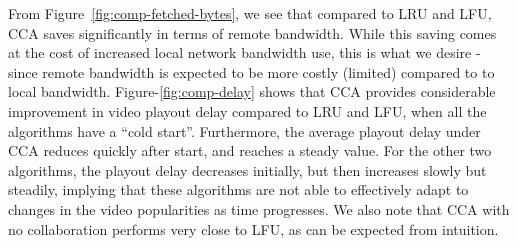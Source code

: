 \documentclass[conference]{IEEEtran}
\begin{document}

From Figure~\ref{fig:comp-fetched-bytes}, we see that compared to LRU and LFU, CCA saves significantly in terms of remote bandwidth. While this saving comes at the cost of increased local network bandwidth use, this is what we desire - since remote bandwidth is expected to be more costly (limited) compared to to local bandwidth. Figure-\ref{fig:comp-delay} shows that CCA provides considerable improvement in video playout delay compared to LRU and LFU, when all the algorithms have a ``cold start''. Furthermore, the average playout delay under CCA reduces quickly after start, and reaches a steady value. For the other two algorithms, the playout delay decreases initially, but then increases slowly but steadily, implying that these algorithms are not able to effectively adapt to changes in the video popularities as time progresses. We also note that CCA with no collaboration performs very close to LFU, as can be expected from intuition.






\end{document}
